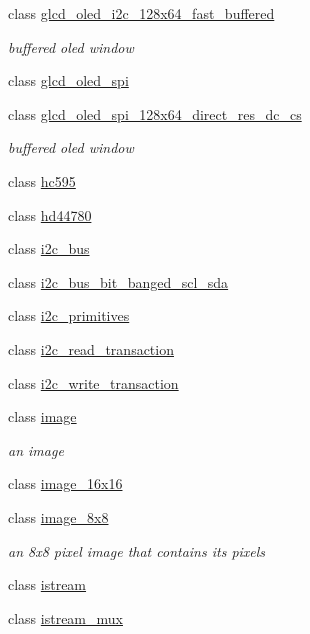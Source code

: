 \begin{DoxyCompactItemize}
class \hyperlink{classhwlib_1_1glcd__oled__i2c__128x64__fast__buffered}{glcd\+\_\+oled\+\_\+i2c\+\_\+128x64\+\_\+fast\+\_\+buffered}
\begin{DoxyCompactList}\small\item\em buffered oled window \end{DoxyCompactList}\item 
class \hyperlink{classhwlib_1_1glcd__oled__spi}{glcd\+\_\+oled\+\_\+spi}
\item 
class \hyperlink{classhwlib_1_1glcd__oled__spi__128x64__direct__res__dc__cs}{glcd\+\_\+oled\+\_\+spi\+\_\+128x64\+\_\+direct\+\_\+res\+\_\+dc\+\_\+cs}
\begin{DoxyCompactList}\small\item\em buffered oled window \end{DoxyCompactList}\item 
class \hyperlink{classhwlib_1_1hc595}{hc595}
\item 
class \hyperlink{classhwlib_1_1hd44780}{hd44780}
\item 
class \hyperlink{classhwlib_1_1i2c__bus}{i2c\+\_\+bus}
\item 
class \hyperlink{classhwlib_1_1i2c__bus__bit__banged__scl__sda}{i2c\+\_\+bus\+\_\+bit\+\_\+banged\+\_\+scl\+\_\+sda}
\item 
class \hyperlink{classhwlib_1_1i2c__primitives}{i2c\+\_\+primitives}
\item 
class \hyperlink{classhwlib_1_1i2c__read__transaction}{i2c\+\_\+read\+\_\+transaction}
\item 
class \hyperlink{classhwlib_1_1i2c__write__transaction}{i2c\+\_\+write\+\_\+transaction}
\item 
class \hyperlink{classhwlib_1_1image}{image}
\begin{DoxyCompactList}\small\item\em an image \end{DoxyCompactList}\item 
class \hyperlink{classhwlib_1_1image__16x16}{image\+\_\+16x16}
\item 
class \hyperlink{classhwlib_1_1image__8x8}{image\+\_\+8x8}
\begin{DoxyCompactList}\small\item\em an 8x8 pixel image that contains its pixels \end{DoxyCompactList}\item 
class \hyperlink{classhwlib_1_1istream}{istream}
\item 
class \hyperlink{classhwlib_1_1istream__mux}{istream\+\_\+mux}

\end{DoxyCompactItemize}
